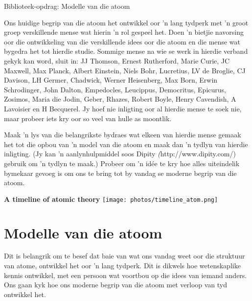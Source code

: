 \begin{project}{Biblioteek-opdrag: Modelle van die atoom}
            \nopagebreak
            \label{m38756*eip-3}

Ons huidige begrip van die atoom het ontwikkel oor 'n lang tydperk met 'n groot groep verskillende mense wat hierin 'n rol gespeel het. Doen 'n bietjie navorsing oor die ontwikkeling van die verskillende idees oor die atoom en die mense wat bygedra het tot hierdie studie. Sommige mense na wie se werk in hierdie verband gekyk kan word, sluit in: JJ Thomson, Ernest Rutherford, Marie Curie, JC Maxwell, Max Planck, Albert Einstein, Niels Bohr, Lucretius, LV de Broglie, CJ Davison, LH Germer, Chadwick, Werner Heisenberg, Max Born, Erwin Schrodinger, John Dalton, Empedocles, Leucippus,
Democritus, Epicurus, Zosimos, Maria die Jodin, Geber, Rhazes, Robert Boyle, Henry Cavendish, A Lavoisier en H Becquerel. Jy hoef nie inligting oor al hierdie mense te soek nie, maar probeer iets kry oor so veel van hulle as moontlik.
\par \begin{minipage}{.6\textwidth}
\label{m38756*id7342}Maak 'n lys van die belangrikste bydraes wat elkeen van hierdie mense gemaak het tot die opbou van 'n model van die atoom en maak dan 'n tydlyn van hier\-die inligting. (Jy kan 'n aanlynhulpmiddel soos Dipity \textsl(http://www.dipity.com/) gebruik om 'n tydlyn te maak.) Probeer om 'n idée te kry hoe alles uiteindelik bymekaar gevoeg is om ons te bring tot by vandag se moderne begrip van die atoom.
\end{minipage}
\begin{minipage}{.4\textwidth}
 \begin{center}
\textbf{A timeline of atomic theory}
  \texttt{[image: photos/timeline\_atom.png]}
 \end{center}

\end{minipage}

\end{project}
\par \label{m38756*cid2}

\section{Modelle van die atoom}
            \nopagebreak
      \label{m38756*id254164}Dit is belangrik om te besef dat baie van wat ons vandag weet oor die struktuur van atome, ontwikkel het oor 'n lang tydperk. Dit is dikwels hoe wetenskaplike kennis ontwikkel, met een persoon wat voortbou op die idees van iemand anders. Ons gaan kyk hoe ons moderne begrip van die atoom met verloop van tyd ontwikkel het.\par 

